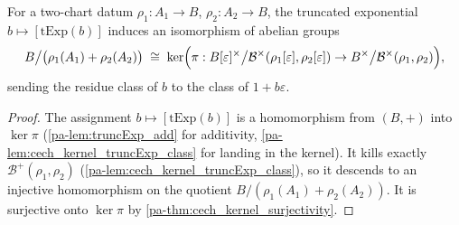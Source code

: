 \begin{theorem}
  \label{pa-thm:truncExp_cech_kernel_equiv}
  \leanok

  For a two-chart datum \(\rho_1 : A_1 \to B\), \(\rho_2 : A_2 \to B\), the truncated
  exponential \(b \mapsto [\mathrm{tExp}(b)]\) induces an isomorphism of abelian groups
  \[
    B \big/ \bigl(\rho_1(A_1) + \rho_2(A_2)\bigr)
    \;\cong\;
    \ker\Bigl( \pi :
      B[\varepsilon]^\times \big/ \mathcal B^\times(\rho_1[\varepsilon],
        \rho_2[\varepsilon])
      \to B^\times \big/ \mathcal B^\times(\rho_1, \rho_2) \Bigr),
  \]
  sending the residue class of \(b\) to the class of \(1 + b\varepsilon\).
\end{theorem}
\begin{proof}
  \leanok
  The assignment \(b \mapsto [\mathrm{tExp}(b)]\) is a homomorphism from \((B, +)\) into
  \(\ker \pi\) (\ref{pa-lem:truncExp_add} for additivity,
  \ref{pa-lem:cech_kernel_truncExp_class} for landing in the kernel). It kills exactly
  \(\mathcal B^+(\rho_1, \rho_2)\) (\ref{pa-lem:cech_kernel_truncExp_class}), so it
  descends to an injective homomorphism on the quotient
  \(B/(\rho_1(A_1) + \rho_2(A_2))\). It is surjective onto \(\ker \pi\) by
  \ref{pa-thm:cech_kernel_surjectivity}.
\end{proof}

